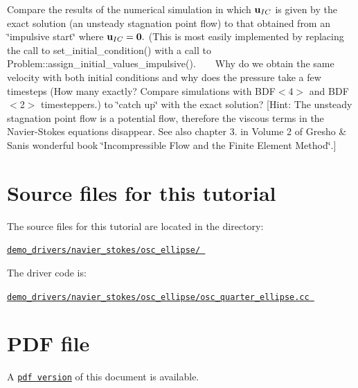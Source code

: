 \begin{DoxyEnumerate}
\item Compare the results of the numerical simulation in which $ {\bf u}_{IC} $ is given by the exact solution (an unsteady stagnation point flow) to that obtained from an \char`\"{}impulsive start\char`\"{} where $ {\bf u}_{IC} = {\bf 0}. $ (This is most easily implemented by replacing the call to {\ttfamily set\+\_\+initial\+\_\+condition()} with a call to {\ttfamily Problem\+::assign\+\_\+initial\+\_\+values\+\_\+impulsive()}. ~\newline
 ~\newline
 Why do we obtain the same velocity with both initial conditions and why does the pressure take a few timesteps (How many exactly? Compare simulations with {\ttfamily B\+D\+F$<$4$>$} and {\ttfamily B\+D\+F$<$2$>$} timesteppers.) to \char`\"{}catch up\char`\"{} with the exact solution? \mbox{[}Hint\+: The unsteady stagnation point flow is a potential flow, therefore the viscous terms in the Navier-\/\+Stokes equations disappear. See also chapter 3. in Volume 2 of Gresho \& Sani\textquotesingle{}s wonderful book \char`\"{}\+Incompressible Flow and the Finite Element Method\char`\"{}.\mbox{]}
\end{DoxyEnumerate}



 

\hypertarget{index_sources}{}\section{Source files for this tutorial}\label{index_sources}

\begin{DoxyItemize}
\item The source files for this tutorial are located in the directory\+: \begin{center} \href{../../../../demo_drivers/navier_stokes/osc_ellipse/}{\tt demo\+\_\+drivers/navier\+\_\+stokes/osc\+\_\+ellipse/ } \end{center} 
\item The driver code is\+: \begin{center} \href{../../../../demo_drivers/navier_stokes/osc_ellipse/osc_quarter_ellipse.cc}{\tt demo\+\_\+drivers/navier\+\_\+stokes/osc\+\_\+ellipse/osc\+\_\+quarter\+\_\+ellipse.\+cc } \end{center} 
\end{DoxyItemize}



 

 \hypertarget{index_pdf}{}\section{P\+D\+F file}\label{index_pdf}
A \href{../latex/refman.pdf}{\tt pdf version} of this document is available. 
